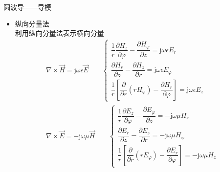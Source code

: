 \begin{frame}{圆波导——导模}
    \begin{itemize}
        \item 纵向分量法\\
              利用纵向分量法表示横向分量\\
              \begin{gather*}
                  \nabla\times\vec{H}=\mathrm{j}\omega\epsilon\vec{E}\qquad
                  \begin{cases}
                      \dfrac{1}{r}\dfrac{\partial H_z}{\partial\varphi}-\dfrac{\partial H_{\varphi}}{\partial z}=\mathrm{j}\omega\epsilon E_r \\
                      \dfrac{\partial H_r}{\partial z}-\dfrac{\partial H_z}{\partial r}=\mathrm{j}\omega\epsilon E_{\varphi}                  \\
                      \dfrac{1}{r}\left[\dfrac{\partial}{\partial r}(rH_{\varphi})-\dfrac{\partial H_r}{\partial\varphi}\right]=\mathrm{j}\omega\epsilon E_z
                  \end{cases}\\
                  \nabla\times\vec{E}=-\mathrm{j}\omega\mu\vec{H}\qquad
                  \begin{cases}
                      \dfrac{1}{r}\dfrac{\partial E_z}{\partial\varphi}-\dfrac{\partial E_{\varphi}}{\partial z}=-\mathrm{j}\omega\mu H_r \\
                      \dfrac{\partial E_r}{\partial z}-\dfrac{\partial E_z}{\partial r}=-\mathrm{j}\omega\mu H_{\varphi}                  \\
                      \dfrac{1}{r}\left[\dfrac{\partial}{\partial r}(rE_{\varphi})-\dfrac{\partial E_r}{\partial\varphi}\right]=-\mathrm{j}\omega\mu H_z
                  \end{cases}
              \end{gather*}
    \end{itemize}
\end{frame}

